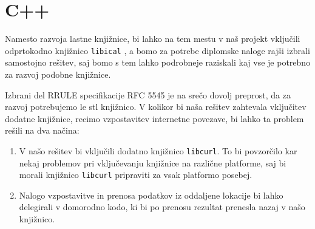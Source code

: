 \begin{table}
\footnotesize
{}
\caption{Pregled funkcionalnosti predstavljenih metod.}
\label{table:omejitve}
\end{table}

\section{C++}

Namesto razvoja lastne knjižnice, bi lahko na tem mestu v naš projekt vključili odprtokodno knjižnico \texttt{libical} \cite{libical}, a bomo za potrebe diplomske naloge rajši izbrali samostojno rešitev, saj bomo s tem lahko podrobneje raziskali kaj vse je potrebno za razvoj podobne knjižnice.

Izbrani del RRULE specifikacije RFC 5545 je na srečo dovolj preprost, da za razvoj potrebujemo le \gls{stl} knjižnico. V kolikor bi naša rešitev zahtevala vključitev dodatne knjižnice, recimo vzpostavitev internetne povezave, bi lahko ta problem rešili na dva načina:

\begin{enumerate}
  \item V našo rešitev bi vključili dodatno knjižnico \texttt{libcurl}. To bi povzorčilo kar nekaj problemov pri vključevanju knjižnice na različne platforme, saj bi morali knjižnico \texttt{libcurl} pripraviti za vsak platformo posebej.
  \item Nalogo vzpostavitve in prenosa podatkov iz oddaljene lokacije bi lahko delegirali v domorodno kodo, ki bi po prenosu rezultat prenesla nazaj v našo knjižnico.
\end{enumerate}

